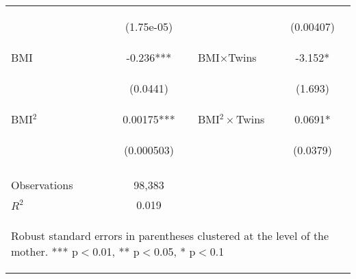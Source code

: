 \begin{table}[htpb!]
\begin{center}
{\begin{tabular}{lclc}
& \begin{footnotesize}(1.75e-05)\end{footnotesize} & \begin{footnotesize}\end{footnotesize} & \begin{footnotesize}(0.00407)\end{footnotesize} \\
BMI & -0.236*** & BMI$\times$Twins & -3.152*  \\
 & \begin{footnotesize}(0.0441)\end{footnotesize}  & \begin{footnotesize}\end{footnotesize} & \begin{footnotesize}(1.693)\end{footnotesize} \\
BMI$^2$ & 0.00175*** & BMI$^2\times$Twins & 0.0691* \\
 & \begin{footnotesize}(0.000503)\end{footnotesize}  & \begin{footnotesize}\end{footnotesize} & \begin{footnotesize}(0.0379)\end{footnotesize} \\
\vspace{4pt} & \begin{footnotesize}\end{footnotesize} & \begin{footnotesize}\end{footnotesize} & \begin{footnotesize}\end{footnotesize} \\
Observations & 98,383 & & \\
 $R^2$ &  0.019 & & \\ \hline
\multicolumn{4}{p{10.2cm}}{\begin{footnotesize} Robust standard errors in parentheses clustered at the level of the mother.  *** p$<$0.01, ** p$<$0.05, * p$<$0.1\end{footnotesize}} \\
\end{tabular}}
\end{center}
\end{table}
